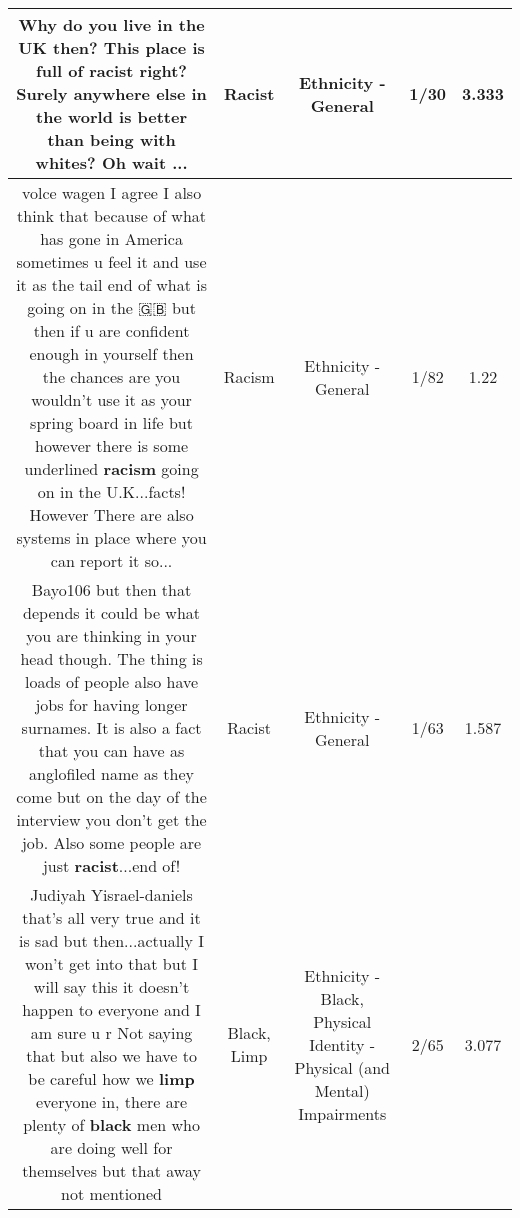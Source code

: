 \documentclass[11pt]{article}
\newlength\mylength
\begin{document}
\begin{center}
\begin{longtable}{|C{.65\mylength}|C{.30\mylength}|C{.12\mylength}|C{.12\mylength}|C{.12\mylength}|}
  \small Why do you live in the UK then? This place is full of \textbf{racist} right? Surely anywhere else in the world is better than being with whites? Oh wait ...\normalsize   & Racist & Ethnicity - General & 1/30 & 3.333 \\  \hline
  \small volce wagen I agree I also think that because of what has gone in America sometimes u feel it and use it as the tail end of what is going on in the 🇬🇧 but then if u are confident enough in yourself then the chances are you wouldn't use it as your spring board in life but however there is some underlined \textbf{racism} going on in the U.K...facts! However There are also systems in place where you can report it so...\normalsize   & Racism & Ethnicity - General & 1/82 & 1.22 \\  \hline
  \small Bayo106 but then that depends it could be what you are thinking in your head though. The thing is loads of people also have jobs for having longer surnames. It is also a fact that you can have as anglofiled  name as they come but on the day of the interview you don't get the job. Also some people are just \textbf{racist}...end of!\normalsize   & Racist & Ethnicity - General & 1/63 & 1.587 \\  \hline
  \small Judiyah Yisrael-daniels that's all very true and it is sad but then...actually I won't get into that but I will say this it doesn't happen to everyone and I am sure u r Not saying that but also we have to be careful how we \textbf{limp} everyone in, there are plenty of \textbf{black} men who are doing well for themselves but that away not mentioned\normalsize   & Black, Limp & Ethnicity - Black, Physical Identity - Physical (and Mental) Impairments & 2/65 & 3.077 \\  \hline

\end{longtable}
\end{center}
\end{document}
